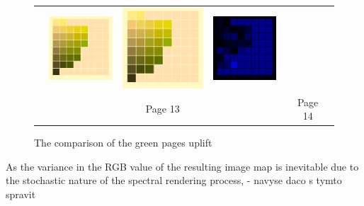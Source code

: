 \begin{figure}[t!]
{\begin{tabular}{ccccccc}
			&\quad
			\includegraphics[width=.155\linewidth]{img/results_uplift_page14_originalFL11.png}
			&
			\includegraphics[width=.155\linewidth]{img/results_uplift_page14_ourFL11.png}
			&
			\includegraphics[width=.155\linewidth]{img/results_uplift_page14_diff_ourFL11.png}\\
			& & Page 13 & & & Page 14 & \\
		\end{tabular}
	}
	\caption{The comparison of the green pages uplift}
	\label{fig:results_uplift_munsell_green_pages}
\end{figure}


 As the variance in the RGB value of the resulting image map is inevitable due to the stochastic nature of the spectral rendering process, - navyse daco s tymto spravit


